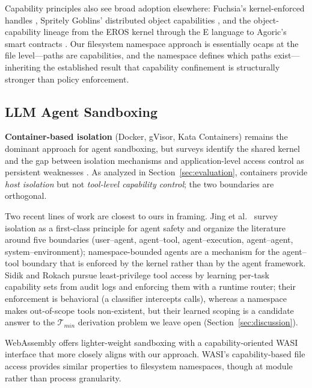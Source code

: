 \documentclass[acmsmall,screen,review]{acmart}
\begin{document}
Capability principles also see broad adoption elsewhere: Fuchsia's kernel-enforced handles \cite{fuchsia2025}, Spritely Goblins' distributed object capabilities \cite{spritely2025goblins}, and the object-capability lineage from the EROS kernel \cite{eros2000} through the E language \cite{elanguage2000} to Agoric's smart contracts \cite{agoric2025,miller2006capability}. Our filesystem namespace approach is essentially ocaps at the file level---paths are capabilities, and the namespace defines which paths exist---inheriting the established result that capability confinement is structurally stronger than policy enforcement.

\subsection{LLM Agent Sandboxing}

\textbf{Container-based isolation} (Docker, gVisor, Kata Containers) remains the dominant approach for agent sandboxing, but surveys identify the shared kernel and the gap between isolation mechanisms and application-level access control as persistent weaknesses \cite{sultan2019container,acm2024container}. As analyzed in Section~\ref{sec:evaluation}, containers provide \textit{host isolation} but not \textit{tool-level capability control}; the two boundaries are orthogonal.

Two recent lines of work are closest to ours in framing. Jing et al.\ \cite{jing2026isolation} survey isolation as a first-class principle for agent safety and organize the literature around five boundaries (user--agent, agent--tool, agent--execution, agent--agent, system--environment); namespace-bounded agents are a mechanism for the agent--tool boundary that is enforced by the kernel rather than by the agent framework. Sidik and Rokach \cite{sidik2026aethelgard} pursue least-privilege tool access by learning per-task capability sets from audit logs and enforcing them with a runtime router; their enforcement is behavioral (a classifier intercepts calls), whereas a namespace makes out-of-scope tools non-existent, but their learned scoping is a candidate answer to the $\mathcal{T}_{min}$ derivation problem we leave open (Section~\ref{sec:discussion}).

WebAssembly offers lighter-weight sandboxing \cite{nvidia2024wasm} with a capability-oriented WASI interface that more closely aligns with our approach. WASI's capability-based file access provides similar properties to filesystem namespaces, though at module rather than process granularity.
\end{document}
